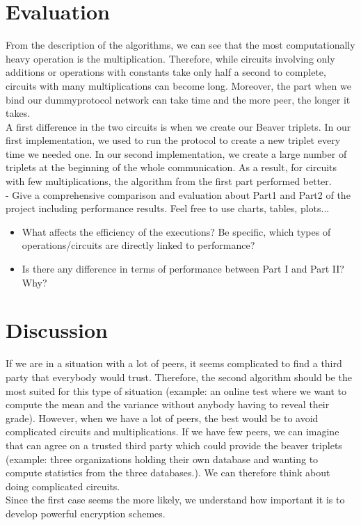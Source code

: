 \documentclass[10pt,conference,compsocconf]{IEEEtran}
\begin{document}
\section{Evaluation}

From the description of the algorithms, we can see that the most computationally heavy operation is the multiplication. Therefore, while circuits involving only additions or operations with constants take only half a second to complete, circuits with many multiplications can become long. Moreover, the part when we bind our dummyprotocol network can take time and the more peer, the longer it takes.\\

A first difference in the two circuits is when we create our Beaver triplets. In our first implementation, we used to run the protocol to create a new triplet every time we needed one. In our second implementation, we create a large number of triplets at the beginning of the whole communication. As a result, for circuits with few multiplications, the algorithm from the first part performed better.\\

- Give a comprehensive comparison and evaluation about Part1 and Part2 of the project including performance results. Feel free to use charts, tables, plots...\\
\begin{itemize}
    \item What affects the efficiency of the executions? Be specific, which types of operations/circuits are directly linked to performance?
    \item Is there any difference in terms of performance between Part I and Part II? Why? 
\end{itemize}

\section{Discussion}

If we are in a situation with a lot of peers, it seems complicated to find a third party that everybody would trust. Therefore, the second algorithm should be the most suited for this type of situation (example: an online test where we want to compute the mean and the variance without anybody having to reveal their grade). However, when we have a lot of peers, the best would be to avoid complicated circuits and multiplications. If we have few peers, we can imagine that can agree on a trusted third party which could provide the beaver triplets (example: three organizations holding their own database and wanting to compute statistics from the three databases.). We can therefore think about doing complicated circuits.\\
Since the first case seems the more likely, we understand how important it is to develop powerful encryption schemes.\\
\end{document}
